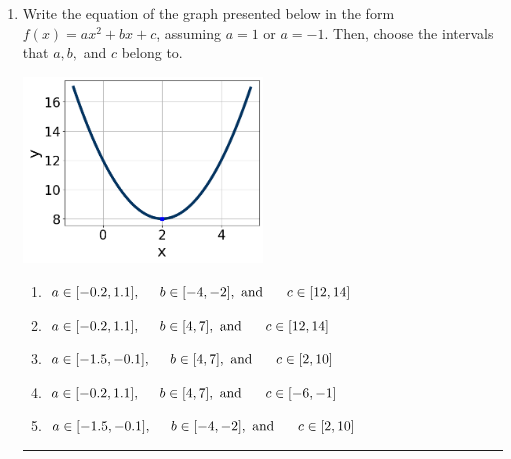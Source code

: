 \documentclass[14pt]{extbook}
\newcommand{\litem}[1]{\item#1\hspace*{-1cm}\rule{\textwidth}{0.4pt}}
\begin{document}
\begin{enumerate}
\litem{
Write the equation of the graph presented below in the form $f(x)=ax^2+bx+c$, assuming  $a=1$ or $a=-1$. Then, choose the intervals that $a, b,$ and $c$ belong to.
\begin{center}
    \includegraphics[width=0.5\textwidth]{../Figures/quadraticGraphToEquationCopyB.png}
\end{center}
\begin{enumerate}[label=\Alph*.]
\item \( a \in [-0.2, 1.1], \hspace*{5mm} b \in [-4, -2], \text{ and } \hspace*{5mm} c \in [12, 14] \)
\item \( a \in [-0.2, 1.1], \hspace*{5mm} b \in [4, 7], \text{ and } \hspace*{5mm} c \in [12, 14] \)
\item \( a \in [-1.5, -0.1], \hspace*{5mm} b \in [4, 7], \text{ and } \hspace*{5mm} c \in [2, 10] \)
\item \( a \in [-0.2, 1.1], \hspace*{5mm} b \in [4, 7], \text{ and } \hspace*{5mm} c \in [-6, -1] \)
\item \( a \in [-1.5, -0.1], \hspace*{5mm} b \in [-4, -2], \text{ and } \hspace*{5mm} c \in [2, 10] \)


\end{enumerate}}
\end{enumerate}
\end{document}
